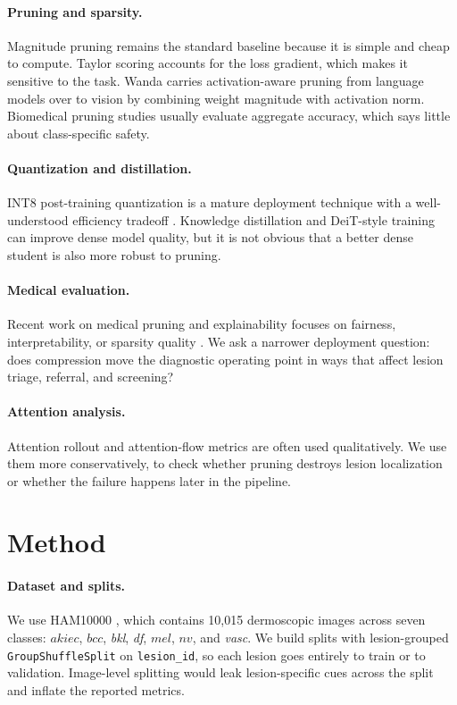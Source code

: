 \documentclass{article}
\newcommand{\mel}{\ensuremath{\textit{mel}}}
\newcommand{\bcc}{\ensuremath{\textit{bcc}}}
\newcommand{\akiec}{\ensuremath{\textit{akiec}}}
\newcommand{\nv}{\ensuremath{\textit{nv}}}
\begin{document}
\paragraph{Pruning and sparsity.}
Magnitude pruning \cite{han2015deep} remains the standard baseline because it is simple and cheap to compute. Taylor scoring \cite{molchanov2017taylor} accounts for the loss gradient, which makes it sensitive to the task. Wanda \cite{sun2023wanda} carries activation-aware pruning from language models over to vision by combining weight magnitude with activation norm. Biomedical pruning studies usually evaluate aggregate accuracy, which says little about class-specific safety.

\paragraph{Quantization and distillation.}
INT8 post-training quantization is a mature deployment technique with a well-understood efficiency tradeoff \cite{jacob2018quantization,gholami2021survey}. Knowledge distillation \cite{hinton2015distillation} and DeiT-style training \cite{touvron2021deit} can improve dense model quality, but it is not obvious that a better dense student is also more robust to pruning.

\paragraph{Medical evaluation.}
Recent work on medical pruning and explainability focuses on fairness, interpretability, or sparsity quality \cite{paxton2025,yu2023xpruner}. We ask a narrower deployment question: does compression move the diagnostic operating point in ways that affect lesion triage, referral, and screening?

\paragraph{Attention analysis.}
Attention rollout and attention-flow metrics \cite{abnar2020attention} are often used qualitatively. We use them more conservatively, to check whether pruning destroys lesion localization or whether the failure happens later in the pipeline.

\section{Method}
\paragraph{Dataset and splits.}
We use HAM10000 \cite{tschandl2018ham10000}, which contains 10{,}015 dermoscopic images across seven classes: \akiec{}, \bcc{}, \textit{bkl}, \textit{df}, \mel{}, \nv{}, and \textit{vasc}. We build splits with lesion-grouped \texttt{GroupShuffleSplit} on \texttt{lesion\_id}, so each lesion goes entirely to train or to validation. Image-level splitting would leak lesion-specific cues across the split and inflate the reported metrics.
\end{document}
